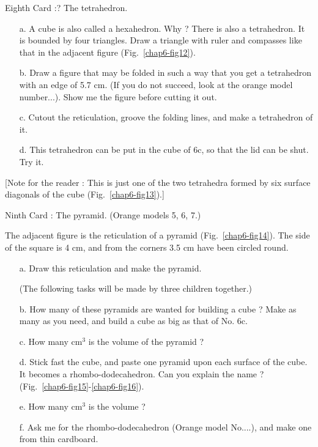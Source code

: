 Eighth Card :? The tetrahedron.
\begin{itemize}
\item[a.] A cube is also called a hexahedron. Why ? There is also a tetrahedron. It is bounded by four triangles. Draw a triangle with ruler and compasses like that in the adjacent figure (Fig.~\ref{chap6-fig12}).

\item[b.] Draw a figure that may be folded in such a way that you get a tetrahedron with an edge of 5.7 cm. (If you do not succeed, look at the orange model number...). Show me the figure before cutting it out.

\item[c.] Cut\pageoriginale out the reticulation, groove the folding lines, and make a tetrahedron of it.

\item[d.] This tetrahedron can be put in the cube of 6c, so that the lid can be shut. Try it.
\end{itemize}

[Note for the reader : This is just one of the two tetrahedra formed by six surface diagonals of the cube (Fig.~\ref{chap6-fig13}).]

Ninth Card : The pyramid. (Orange models 5, 6, 7.)

The adjacent figure is the reticulation of a pyramid (Fig.~\ref{chap6-fig14}). The side of the square is 4 cm, and from the corners 3.5 cm have been circled round.
\begin{itemize}
\item[a.] Draw this reticulation and make the pyramid.

(The following tasks will be made by three children together.)

\item[b.] How many of these pyramids are wanted for building a cube ? Make as many as you need, and build a cube as big as that of No. 6c.

\item[c.] How many cm$^{3}$ is the volume of the pyramid ?

\item[d.] Stick fast the cube, and paste one pyramid upon each surface of the cube. It becomes a rhombo-dodecahedron. Can you explain the name ? (Fig.~\ref{chap6-fig15}-\ref{chap6-fig16}).

\item[e.] How many cm$^{3}$ is the volume ?

\item[f.] Ask me for the rhombo-dodecahedron (Orange model No....), and make one from thin cardboard. 
\end{itemize}

